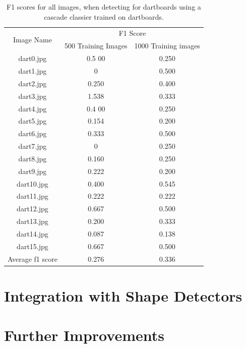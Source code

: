 \documentclass[conference]{IEEEtran}
\begin{document}
\begin{table}[htp]
\caption{F1 scores for all images, when detecting for dartboards using a cascade classier trained on dartboards.}
\begin{center}
\begin{tabular}{||c|c|c||}
\hline
\multirow{2}{*}{Image Name} & \multicolumn{2}{c||}{F1 Score}                \\ 
                                 & 500 Training Images	& 1000 Training images \\ \hline
dart0.jpg			& 0.5	00	&	0.250	\\
dart1.jpg			& 0		&	0.500	\\
dart2.jpg			& 0.250	&	0.400	\\
dart3.jpg			& 1.538	&	0.333	\\
dart4.jpg			& 0.4	00	&	0.250	\\
dart5.jpg			& 0.154	&	0.200	\\
dart6.jpg			& 0.333	&	0.500	\\
dart7.jpg			& 0		&	0.250	\\
dart8.jpg			& 0.160	&	0.250	\\
dart9.jpg			& 0.222	&	0.200	\\
dart10.jpg			& 0.400	&	0.545	\\
dart11.jpg			& 0.222	&	0.222	\\
dart12.jpg			& 0.667	&	0.500	\\
dart13.jpg			& 0.200	&	0.333	\\
dart14.jpg			& 0.087	&	0.138	\\
dart15.jpg			& 0.667	&	0.500	\\ \hline
Average f1 score 	& 0.276	&	0.336	\\ \hline
\end{tabular}
\end{center}
\label{default}
\end{table}%
\newpage
\section{Integration with Shape Detectors}
\newpage
\section{Further Improvements}
\end{document}

